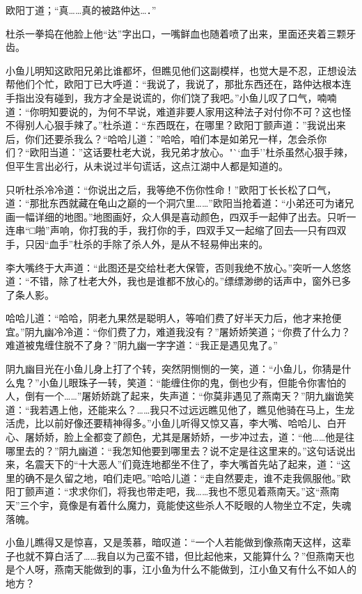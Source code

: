 \documentclass[12pt,oneside]{book}
\begin{document}
欧阳丁道；``真\ldots\ldots 真的被路仲达\ldots．''

杜杀一拳捣在他脸上他``达''字出口，一嘴鲜血也随着喷了出来，里面还夹着三颗牙齿。

小鱼儿明知这欧阳兄弟比谁都坏，但瞧见他们这副模样，也觉大是不忍，正想设法帮他们个忙，欧阳丁已大呼道：``我说了，我说了，那批东西还在，路仲达根本连手指出没有碰到，我方才全是说谎的，你们饶了我吧。''小鱼儿叹了口气，喃喃道：``你明知要说的，为何不早说，难道非要人家用这种法子对付你不可？这也怪不得别人心狠手辣了。''杜杀道：``东西既在，在哪里？欧阳丁颤声道：''我说出来后，你们还要杀我么？``哈哈儿道：''哈哈，咱们本是如弟兄一样，怎会杀你们？``欧阳当道：''这话要杜老大说，我兄弟才放心。"``血手''杜杀虽然心狠手辣，但平生言出必行，从未说过半句谎话，这点江湖中人都是知道的。

只听杜杀冷冷道：``你说出之后，我等绝不伤你性命！''欧阳丁长长松了口气，道：``那批东西就藏在龟山之巅的一个洞穴里\ldots\ldots{}''欧阳当抢着道：``小弟还可为诸兄画一幅详细的地图。''地图画好，众人俱是喜动颜色，四双手一起伸了出去。只听一连串``□啪''声响，你打我的手，我打你的手，四双手又一起缩了回去──只有四双手，只因``血手''杜杀的手除了杀人外，是从不轻易伸出来的。

李大嘴终于大声道：``此图还是交给杜老大保管，否则我绝不放心。''突听一人悠悠道：``不错，除了杜老大外，我也是谁都不放心的。''缥缥渺缈的话声中，窗外已多了条人影。

哈哈儿道：``哈哈，阴老九果然是聪明人，等咱们费了好半天力后，他才来抢便宜。''阴九幽冷冷道：``你们费了力，难道我没有？''屠娇娇笑道；``你费了什么力？难道被鬼缠住脱不了身？''阴九幽一字字道：``我正是遇见鬼了。''

阴九幽目光在小鱼儿身上打了个转，突然阴恻恻的一笑，道：``小鱼儿，你猜是什么鬼？''小鱼儿眼珠子一转，笑道：``能缠住你的鬼，倒也少有，但能令你害怕的人，倒有一个\ldots\ldots{}''屠娇娇跳了起来，失声道：``你莫非遇见了燕南天？''阴九幽诡笑道：``我若遇上他，还能来么？\ldots\ldots 我只不过远远瞧见他了，瞧见他骑在马上，生龙活虎，比以前好像还要精神得多。''小鱼儿听得又惊又喜，李大嘴、哈哈儿、白开心、屠娇娇，脸上全都变了颜色，尤其是屠娇娇，一步冲过去，道：``他\ldots\ldots 他是往哪里去的？''阴九幽道：``我怎知他要到哪里去？说不定是往这里来的。''这句话说出来，名震天下的``十大恶人''们竟连地都坐不住了，李大嘴首先站了起来，道：``这里的确不是久留之地，咱们走吧。''哈哈儿道：``走自然要走，谁不走我佩服他。''欧阳丁颤声道：``求求你们，将我也带走吧，我\ldots\ldots 我也不愿见着燕南天。''这``燕南天''三个宇，竟像是有着什么魔力，竟能使这些杀人不眨眼的人物坐立不定，失魂落魄。

小鱼儿瞧得又是惊喜，又是羡慕，暗叹道：``一个人若能做到像燕南天这样，这辈子也就不算白活了\ldots\ldots 我自以为己蛮不错，但比起他来，又能算什么？''但燕南天也是个人呀，燕南天能做到的事，江小鱼为什么不能做到，江小鱼又有什么不如人的地方？
\end{document}
